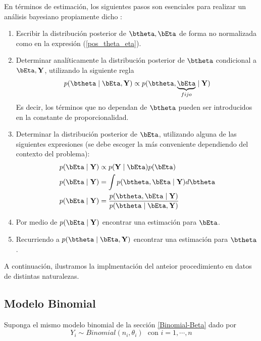 \documentclass[10pt,openright]{book}\usepackage[]{graphicx}\usepackage[]{color}
\begin{document}
En t\'erminos de estimaci\'on, los siguientes pasos son esenciales para realizar un an\'alisis bayesiano propiamente dicho \cite{Gelman03}:

\begin{enumerate}
  \item Escribir la distribuci\'on posterior de $\btheta,\bEta$ de forma no normalizada como en la expresi\'on (\ref{pos_theta_eta}).
  \item Determinar anal\'iticamente la distribuci\'on posterior de $\btheta$ condicional a $\bEta,\mathbf{Y}$, utilizando la siguiente regla
      \begin{equation*}
      p(\btheta \mid \bEta,\mathbf{Y}) \propto p(\btheta,\underbrace{\bEta}_{fijo} \mid \mathbf{Y})
      \end{equation*}
      Es decir, los t\'erminos que no dependan de $\btheta$ pueden ser introducidos en la constante de proporcionalidad.
  \item Determinar la distribuci\'on posterior de $\bEta$, utilizando alguna de las siguientes expresiones (se debe escoger la m\'as conveniente dependiendo del contexto del problema):
      \begin{align}
      p(\bEta \mid \mathbf{Y})&\propto p(\mathbf{Y} \mid \bEta)p(\bEta)\label{bEta1}\\
      p(\bEta \mid \mathbf{Y})&= \int p(\btheta, \bEta \mid \mathbf{Y}) d\btheta\label{bEta2}\\
      p(\bEta \mid \mathbf{Y})&= \frac{p(\btheta, \bEta \mid \mathbf{Y})}{p(\btheta \mid \bEta,\mathbf{Y})}\label{bEta3}
      \end{align}
  \item Por medio de $p(\bEta \mid \mathbf{Y})$ encontrar una estimaci\'on para $\bEta$.
  \item Recurriendo a  $p(\btheta \mid \bEta,\mathbf{Y})$ encontrar una estimaci\'on para $\btheta$.
\end{enumerate}

A continuaci\'on, ilustramos la implmentaci\'on del anteior procedimiento en datos de distintas naturalezas. 

\subsection{Modelo Binomial}
Suponga el mismo modelo binomial de la secci\'on \ref{Binomial-Beta} dado por
\begin{equation*}
Y_i \sim Binomial(n_i,\theta_i)\ \ \ \text{con $i=1,\cdots,n$}
\end{equation*}
\end{document}
